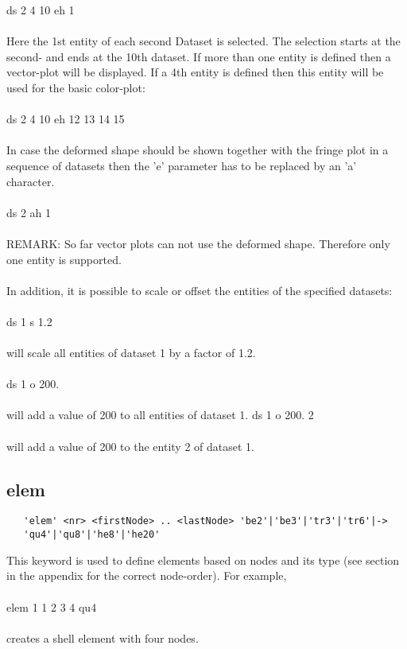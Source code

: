 \documentclass{article}
\begin{document}
ds 2 4 10 eh 1\\\\
Here the 1st entity of each second Dataset is selected. The selection starts at the second- and ends at the 10th dataset. If more than one entity is defined then a vector-plot will be displayed. If a 4th entity is defined then this entity will be used for the basic color-plot:\\\\
ds 2 4 10 eh 12 13 14 15\\\\
In case the deformed shape should be shown together with the fringe plot in a sequence of datasets then the 'e' parameter has to be replaced by an 'a' character.\\\\
ds 2 ah 1\\\\ REMARK: So far vector plots can not use the deformed shape. Therefore only one entity is supported.\\\\
In addition, it is possible to scale or offset the entities of the specified datasets:\\\\
ds 1 s 1.2\\\\
will scale all entities of dataset 1 by a factor of 1.2.\\\\
ds 1 o 200.\\\\
will add a value of 200 to all entities of dataset 1.
ds 1 o 200. 2\\\\
will add a value of 200 to the entity 2 of dataset 1.

\subsection{\label{elem}elem}
\begin{verbatim}
   'elem' <nr> <firstNode> .. <lastNode> 'be2'|'be3'|'tr3'|'tr6'|->
   'qu4'|'qu8'|'he8'|'he20'
\end{verbatim}
This keyword is used to define elements based on nodes and its type (see section  in the appendix for the correct node-order). For example,\\\\
elem 1 1 2 3 4 qu4\\\\creates a shell element with four nodes.
\end{document}
